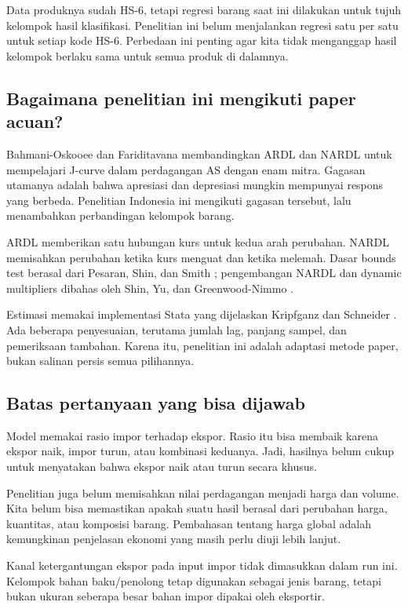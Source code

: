 Data produknya sudah HS-6, tetapi regresi barang saat ini dilakukan untuk tujuh kelompok hasil klasifikasi. Penelitian ini belum menjalankan regresi satu per satu untuk setiap kode HS-6. Perbedaan ini penting agar kita tidak menganggap hasil kelompok berlaku sama untuk semua produk di dalamnya.

\subsection{Bagaimana penelitian ini mengikuti paper acuan?}
Bahmani-Oskooee dan Fariditavana \cite{bahmani} membandingkan ARDL dan NARDL untuk mempelajari J-curve dalam perdagangan AS dengan enam mitra. Gagasan utamanya adalah bahwa apresiasi dan depresiasi mungkin mempunyai respons yang berbeda. Penelitian Indonesia ini mengikuti gagasan tersebut, lalu menambahkan perbandingan kelompok barang.

ARDL memberikan satu hubungan kurs untuk kedua arah perubahan. NARDL memisahkan perubahan ketika kurs menguat dan ketika melemah. Dasar bounds test berasal dari Pesaran, Shin, dan Smith \cite{pss}; pengembangan NARDL dan dynamic multipliers dibahas oleh Shin, Yu, dan Greenwood-Nimmo \cite{shin}.

Estimasi memakai implementasi Stata yang dijelaskan Kripfganz dan Schneider \cite{ks}. Ada beberapa penyesuaian, terutama jumlah lag, panjang sampel, dan pemeriksaan tambahan. Karena itu, penelitian ini adalah adaptasi metode paper, bukan salinan persis semua pilihannya.

\subsection{Batas pertanyaan yang bisa dijawab}
Model memakai rasio impor terhadap ekspor. Rasio itu bisa membaik karena ekspor naik, impor turun, atau kombinasi keduanya. Jadi, hasilnya belum cukup untuk menyatakan bahwa ekspor naik atau turun secara khusus.

Penelitian juga belum memisahkan nilai perdagangan menjadi harga dan volume. Kita belum bisa memastikan apakah suatu hasil berasal dari perubahan harga, kuantitas, atau komposisi barang. Pembahasan tentang harga global adalah kemungkinan penjelasan ekonomi yang masih perlu diuji lebih lanjut.

Kanal ketergantungan ekspor pada input impor tidak dimasukkan dalam run ini. Kelompok bahan baku/penolong tetap digunakan sebagai jenis barang, tetapi bukan ukuran seberapa besar bahan impor dipakai oleh eksportir.
